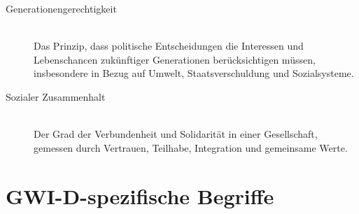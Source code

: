 \begin{description}
    \item[Generationengerechtigkeit] \hfill \\
    Das Prinzip, dass politische Entscheidungen die Interessen und Lebenschancen zukünftiger Generationen berücksichtigen müssen, insbesondere in Bezug auf Umwelt, Staatsverschuldung und Sozialsysteme.
    
    \item[Sozialer Zusammenhalt] \hfill \\
    Der Grad der Verbundenheit und Solidarität in einer Gesellschaft, gemessen durch Vertrauen, Teilhabe, Integration und gemeinsame Werte.
\end{description}

\section{GWI-D-spezifische Begriffe}

